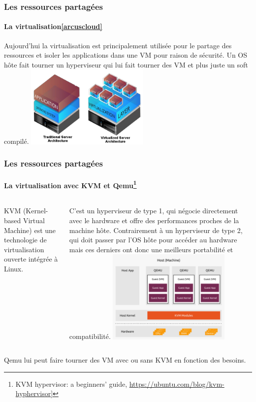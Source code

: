 \documentclass{beamer}
\begin{document}
    \begin{frame}
        \transdissolve
        \frametitle{Les ressources partagées}
        \framesubtitle{La virtualisation\cref{arcuscloud}}
        Aujourd'hui la virtualisation est principalement utilisée pour le partage des ressources et isoler les applications dans une VM pour raison de sécurité.
        Un OS hôte fait tourner un hyperviseur qui lui fait tourner des VM et plus juste un soft compilé.
        \bigbreak
        \centering
        \includegraphics[width=6cm]{image/virtualisation}
    \end{frame}

    \begin{frame}
        \transdissolve
        \frametitle{Les ressources partagées}
        \framesubtitle{La virtualisation avec KVM et Qemu\footnote{\label{ubuntukvm}KVM hypervisor: a beginners’ guide, \url{https://ubuntu.com/blog/kvm-hyphervisor}]}}
        \begin{columns}
            KVM (Kernel-based Virtual Machine) est une technologie de virtualisation ouverte intégrée à Linux.

            C'est un hyperviseur de type 1, qui négocie directement avec le hardware et offre des performances proches de la machine hôte.
            Contrairement à un hyperviseur de type 2, qui doit passer par l'OS hôte pour accéder au hardware mais ces derniers ont donc une meilleurs portabilité et compatibilité.
            \centering
            \includegraphics[width=6cm]{image/kvm-qemu}
        \end{columns}
        \bigbreak
        Qemu lui peut faire tourner des VM avec ou sans KVM en fonction des besoins.
    \end{frame}
\end{document}
